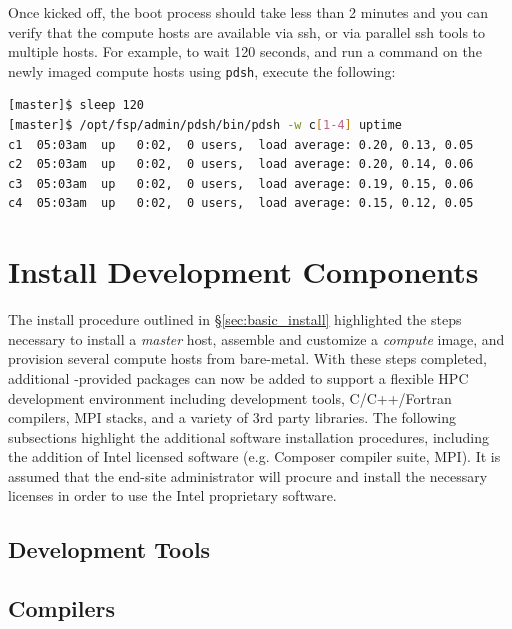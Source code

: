 \documentclass[letterpaper]{article}
\begin{document}
Once kicked off, the boot process should take less than 2 minutes and you can
verify that the compute hosts are available via ssh, or via parallel ssh tools to multiple
hosts. For example, to wait 120 seconds, and run a command on the newly imaged
compute hosts using \texttt{pdsh}, execute the following:

\begin{lstlisting}[language=bash]
[master]$ sleep 120
[master]$ /opt/fsp/admin/pdsh/bin/pdsh -w c[1-4] uptime
c1  05:03am  up   0:02,  0 users,  load average: 0.20, 0.13, 0.05
c2  05:03am  up   0:02,  0 users,  load average: 0.20, 0.14, 0.06
c3  05:03am  up   0:02,  0 users,  load average: 0.19, 0.15, 0.06
c4  05:03am  up   0:02,  0 users,  load average: 0.15, 0.12, 0.05
\end{lstlisting}



\section{Install \FSP{} Development Components}

The install procedure outlined in \S\ref{sec:basic_install}
highlighted the steps necessary to install a {\em master} host,
assemble and customize a {\em compute} image, and provision several
compute hosts from bare-metal.  With these steps completed, 
additional \FSP{}-provided packages can now be added to support a flexible HPC
development environment including development tools, C/C++/Fortran compilers,
MPI stacks, and a variety of 3rd party libraries. The following subsections
highlight the additional software installation procedures, including the
addition of Intel licensed software (e.g. Composer compiler suite, \Intel{}
MPI). It is assumed that the end-site administrator will procure and install
the necessary licenses in order to use the Intel proprietary software.

\subsection{Development Tools} \label{sec:install_dev_tools}


\subsection{Compilers} \label{sec:install_compilers}

\end{document}
